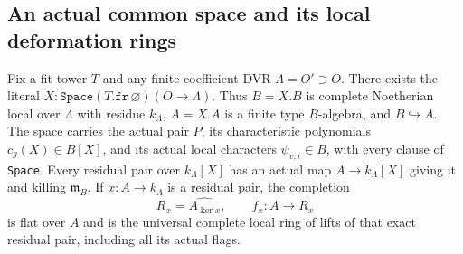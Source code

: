 \subsection{An actual common space and its local deformation rings}

\begin{proposition}
Fix a fit tower $T$ and any finite coefficient DVR
$\Lambda=O'\supset O$.  There exists the literal
$X:\mathtt{Space}(T.\mathtt{fr}\,\varnothing)(O\to\Lambda)$.
Thus $B=X.B$ is complete Noetherian local over $\Lambda$
with residue $k_\Lambda$, $A=X.A$ is a finite type
$B$-algebra, and $B\hookrightarrow A$.  The space carries
the actual pair $P$, its characteristic polynomials
$c_g(X)\in B[X]$, and its actual local characters
$\psi_{v,i}\in B$, with every clause of \texttt{Space}.
Every residual pair over $k_\Lambda[X]$ has an actual
map $A\to k_\Lambda[X]$ giving it and killing
$\mathfrak m_B$.  If $x:A\to k_\Lambda$ is a residual
pair, the completion
\[
 R_x=\widehat{A_{\ker x}},\qquad f_x:A\longrightarrow R_x
 \tag{UX.31}
\]
is flat over $A$ and is the universal complete local
ring of lifts of that exact residual pair, including
all its actual flags.
\end{proposition}

